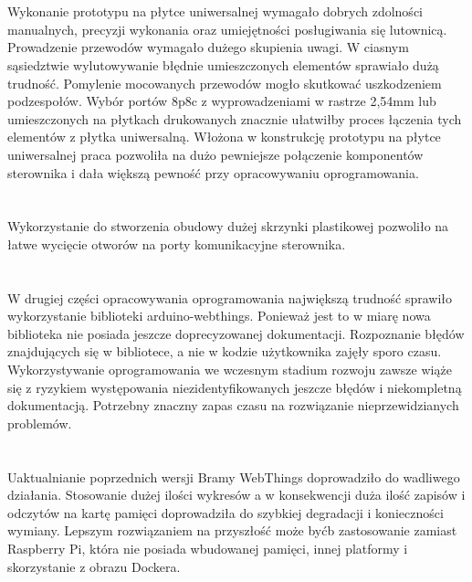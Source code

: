 \documentclass[11pt]{report}
\begin{document}
\section{}
Wykonanie prototypu na płytce uniwersalnej wymagało dobrych zdolności manualnych, precyzji wykonania oraz umiejętności posługiwania się lutownicą. Prowadzenie przewodów wymagało dużego skupienia uwagi. W ciasnym sąsiedztwie wylutowywanie błędnie umieszczonych elementów sprawiało dużą trudność. Pomylenie mocowanych przewodów mogło skutkować uszkodzeniem podzespołów.
Wybór portów 8p8c z wyprowadzeniami w rastrze 2,54mm lub umieszczonych na płytkach drukowanych znacznie ułatwiłby proces łączenia tych elementów z płytka uniwersalną.
Włożona w konstrukcję prototypu na płytce uniwersalnej praca pozwoliła na dużo pewniejsze połączenie komponentów sterownika i dała większą pewność przy opracowywaniu oprogramowania.
\section{}
Wykorzystanie do stworzenia obudowy dużej skrzynki plastikowej pozwoliło na łatwe wycięcie otworów na porty komunikacyjne sterownika.
\section{}
W drugiej części opracowywania oprogramowania największą trudność sprawiło wykorzystanie biblioteki arduino-webthings. Ponieważ jest to w miarę nowa biblioteka nie posiada jeszcze doprecyzowanej dokumentacji. Rozpoznanie błędów znajdujących się w bibliotece, a nie w kodzie użytkownika zajęły sporo czasu.
Wykorzystywanie oprogramowania we wczesnym stadium rozwoju zawsze wiąże się z ryzykiem występowania niezidentyfikowanych jeszcze błędów i niekompletną dokumentacją. Potrzebny znaczny zapas czasu na rozwiązanie nieprzewidzianych problemów.
\section{}
Uaktualnianie poprzednich wersji Bramy WebThings doprowadziło do wadliwego działania.
Stosowanie dużej ilości wykresów a w konsekwencji duża ilość zapisów i odczytów na kartę pamięci doprowadziła do szybkiej degradacji i konieczności wymiany.
Lepszym rozwiązaniem na przyszłość może byćb zastosowanie zamiast Raspberry Pi, która nie posiada wbudowanej pamięci, innej platformy i skorzystanie z obrazu Dockera.
 
\end{document}
